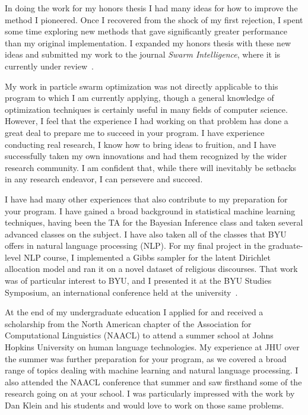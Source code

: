 \documentclass[onecolumn, 12pt]{article}
\begin{document}
In doing the work for my honors thesis I had many ideas for how to improve the
method I pioneered.  Once I recovered from the shock of my first rejection, I
spent some time exploring new methods that gave significantly greater
performance than my original implementation.  I expanded my honors thesis with
these new ideas and submitted my work to the journal \emph{Swarm Intelligence},
where it is currently under
review~\cite{gardner-2010-speculative-approach-to-parallelization-pso}.

My work in particle swarm optimization was not directly applicable to this
program to which I am currently applying, though a general knowledge of
optimization techniques is certainly useful in many fields of computer science.
However, I feel that the experience I had working on that problem has done a
great deal to prepare me to succeed in your program.  I have experience
conducting real research, I know how to bring ideas to fruition, and I have
successfully taken my own innovations and had them recognized by the wider
research community.  I am confident that, while there will inevitably be
setbacks in any research endeavor, I can persevere and succeed.

I have had many other experiences that also contribute to my preparation for
your program.  I have gained a broad background in statistical machine learning
techniques, having been the TA for the Bayesian Inference class and taken
several advanced classes on the subject.  I have also taken all of the classes
that BYU offers in natural language processing (NLP).  For my final project in
the graduate-level NLP course, I implemented a Gibbs sampler for the latent
Dirichlet allocation model and ran it on a novel dataset of religious
discourses.  That work was of particular interest to BYU, and I presented it at
the BYU Studies Symposium, an international conference held at the
university~\cite{gardner-2010-general-conference-topics}.

At the end of my undergraduate education I applied for and received a
scholarship from the North American chapter of the Association for
Computational Linguistics (NAACL) to attend a summer school at Johns Hopkins
University on human language technologies.  My experience at JHU over the
summer was further preparation for your program, as we covered a broad range of
topics dealing with machine learning and natural language processing.  I also
attended the NAACL conference that summer and saw firsthand some of the
research going on at your school.  I was particularly impressed with the work
by Dan Klein and his students and would love to work on those same problems.
\end{document}
